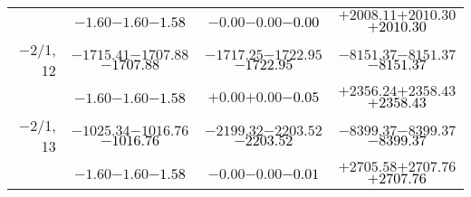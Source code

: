 \documentclass[compress]{beamer}
\begin{document}
\begin{frame}
{\begin{tabular}{r | c | c | c}
           & $-1.60$\hspace{0.1 cm}$-1.60$\hspace{0.1 cm}\textcolor{black}{$-1.58$} & $-0.00$\hspace{0.1 cm}$-0.00$\hspace{0.1 cm}\textcolor{black}{$-0.00$} & $+2008.11$\hspace{0.1 cm}$+2010.30$\hspace{0.1 cm}\textcolor{black}{$+2010.30$} \\
$-$2/1, 12 & $-1715.41$\hspace{0.1 cm}$-1707.88$\hspace{0.1 cm}\textcolor{black}{$-1707.88$} & $-1717.25$\hspace{0.1 cm}$-1722.95$\hspace{0.1 cm}\textcolor{black}{$-1722.95$} & $-8151.37$\hspace{0.1 cm}$-8151.37$\hspace{0.1 cm}\textcolor{black}{$-8151.37$} \\
           & $-1.60$\hspace{0.1 cm}$-1.60$\hspace{0.1 cm}\textcolor{black}{$-1.58$} & $+0.00$\hspace{0.1 cm}$+0.00$\hspace{0.1 cm}\textcolor{black}{$-0.05$} & $+2356.24$\hspace{0.1 cm}$+2358.43$\hspace{0.1 cm}\textcolor{black}{$+2358.43$} \\
$-$2/1, 13 & $-1025.34$\hspace{0.1 cm}$-1016.76$\hspace{0.1 cm}\textcolor{black}{$-1016.76$} & $-2199.32$\hspace{0.1 cm}$-2203.52$\hspace{0.1 cm}\textcolor{black}{$-2203.52$} & $-8399.37$\hspace{0.1 cm}$-8399.37$\hspace{0.1 cm}\textcolor{black}{$-8399.37$} \\
           & $-1.60$\hspace{0.1 cm}$-1.60$\hspace{0.1 cm}\textcolor{black}{$-1.58$} & $-0.00$\hspace{0.1 cm}$-0.00$\hspace{0.1 cm}\textcolor{black}{$-0.01$} & $+2705.58$\hspace{0.1 cm}$+2707.76$\hspace{0.1 cm}\textcolor{black}{$+2707.76$} \\

\end{tabular}}
\end{frame}
\end{document}
